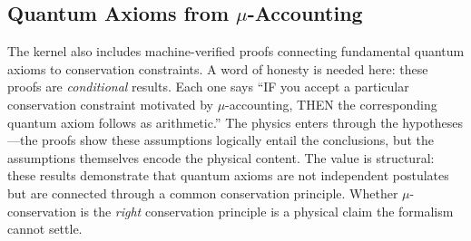 \subsection{Quantum Axioms from $\mu$-Accounting}

The kernel also includes machine-verified proofs connecting fundamental quantum axioms to conservation constraints. A word of honesty is needed here: these proofs are \textit{conditional} results. Each one says ``IF you accept a particular conservation constraint motivated by $\mu$-accounting, THEN the corresponding quantum axiom follows as arithmetic.'' The physics enters through the hypotheses---the proofs show these assumptions logically entail the conclusions, but the assumptions themselves encode the physical content. The value is structural: these results demonstrate that quantum axioms are not independent postulates but are connected through a common conservation principle. Whether $\mu$-conservation is the \textit{right} conservation principle is a physical claim the formalism cannot settle.

